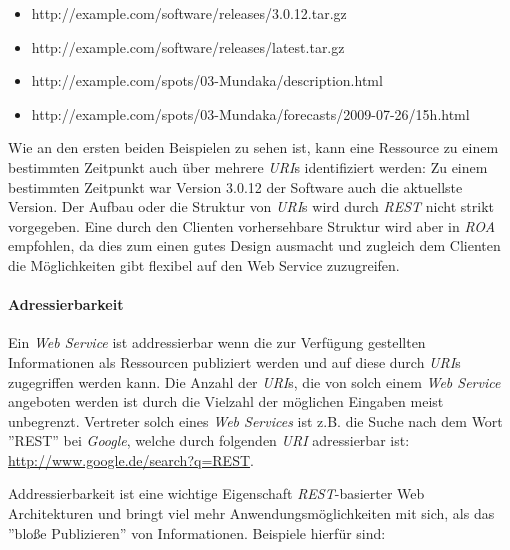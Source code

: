 \begin{itemize}
\item http://example.com/software/releases/3.0.12.tar.gz
\item http://example.com/software/releases/latest.tar.gz
\item http://example.com/spots/03-Mundaka/description.html
\item http://example.com/spots/03-Mundaka/forecasts/2009-07-26/15h.html
\end{itemize}

Wie an den ersten beiden Beispielen zu sehen ist, kann eine Ressource
zu einem bestimmten Zeitpunkt auch über mehrere \textit{URI}s
identifiziert werden: Zu einem bestimmten Zeitpunkt war Version 3.0.12
der Software auch die aktuellste Version. Der Aufbau oder die Struktur
von \textit{URI}s wird durch \textit{REST} nicht strikt vorgegeben.
Eine durch den Clienten vorhersehbare Struktur wird aber in
\textit{ROA} empfohlen, da dies zum einen gutes Design ausmacht und
zugleich dem Clienten die Möglichkeiten gibt flexibel auf den Web
Service zuzugreifen.

\paragraph{Adressierbarkeit}

Ein \textit{Web Service} ist addressierbar wenn die zur Verfügung
gestellten Informationen als Ressourcen publiziert werden und auf
diese durch \textit{URI}s zugegriffen werden kann. Die Anzahl der
\textit{URI}s, die von solch einem \textit{Web Service} angeboten
werden ist durch die Vielzahl der möglichen Eingaben meist unbegrenzt.
Vertreter solch eines \textit{Web Services} ist z.B. die Suche nach
dem Wort ''REST'' bei \textit{Google}, welche durch folgenden
\textit{URI} adressierbar ist:
\url{http://www.google.de/search?q=REST}.

Addressierbarkeit ist eine wichtige Eigenschaft
\textit{REST}-basierter Web Architekturen und bringt viel mehr
Anwendungsmöglichkeiten mit sich, als das ''bloße Publizieren'' von
Informationen. Beispiele hierfür sind:

